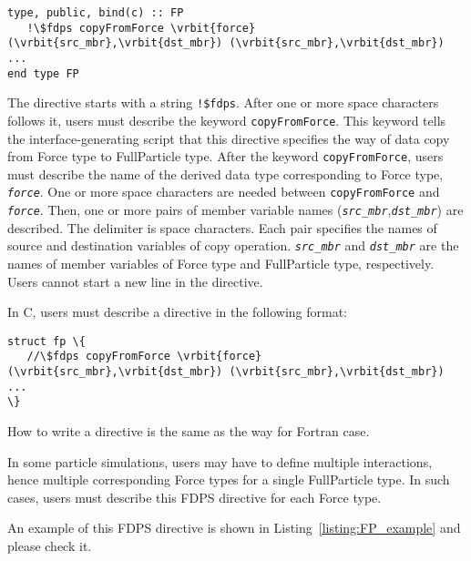\begin{screen}
\begin{Verbatim}[commandchars=\\\{\}]
type, public, bind(c) :: FP
   !\$fdps copyFromForce \vrbit{force} (\vrbit{src_mbr},\vrbit{dst_mbr}) (\vrbit{src_mbr},\vrbit{dst_mbr}) ...
end type FP
\end{Verbatim}
\end{screen}
The directive starts with a string \verb|!$fdps|. After one or more space characters follows it, users must describe the keyword \texttt{copyFromForce}. This keyword tells the interface-generating script that this directive specifies the way of data copy from Force type to FullParticle type. After the keyword \texttt{copyFromForce}, users must describe the name of the derived data type corresponding to Force type, \textit{\texttt{force}}. One or more space characters are needed between \texttt{copyFromForce} and \textit{\texttt{force}}. Then, one or more pairs of member variable names (\textit{\texttt{src\_mbr}},\textit{\texttt{dst\_mbr}}) are described. The delimiter is space characters. Each pair specifies the names of source and destination variables of copy operation. \textit{\texttt{src\_mbr}} and \textit{\texttt{dst\_mbr}} are the names of member variables of Force type and FullParticle type, respectively. Users cannot start a new line in the directive.

In C, users must describe a directive in the following format:
\begin{screen}
\begin{Verbatim}[commandchars=\\\{\}]
struct fp \{
   //\$fdps copyFromForce \vrbit{force} (\vrbit{src_mbr},\vrbit{dst_mbr}) (\vrbit{src_mbr},\vrbit{dst_mbr}) ...
\}
\end{Verbatim}
\end{screen}
How to write a directive is the same as the way for Fortran case.


In some particle simulations, users may have to define multiple interactions, hence multiple corresponding Force types for a single FullParticle type. In such cases, users must describe this FDPS directive for each Force type.

An example of this FDPS directive is shown in Listing~\ref{listing:FP_example} and please check it.


